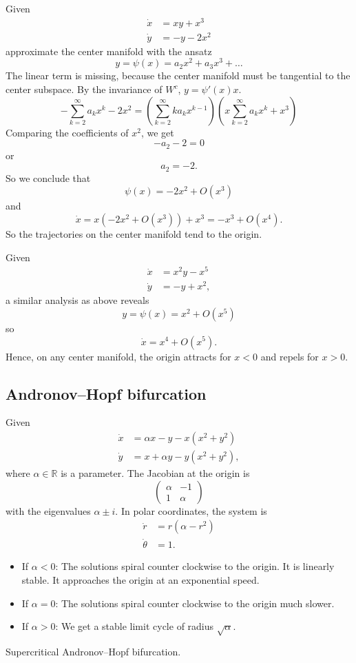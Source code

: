 \documentclass{article}
\newcommand*{\R}{\mathbb{R}}
\newcommand*{\mattwo}[4]{\begin{pmatrix}
    #1&#2\\#3&#4
\end{pmatrix}}
\begin{document}
\begin{exam}
    Given
    $$\begin{aligned}
        \dot x &= xy+x^3\\
        \dot y &= -y-2x^2
    \end{aligned}$$
    approximate the center manifold with the ansatz
    $$y=\psi(x)=a_2x^2+a_3x^3+\dots$$
    The linear term is missing, because the center manifold must be tangential to the center subspace. By the invariance of $W^c$, $y=\psi'(x)x$.
    $$-\sum_{k=2}^\infty a_kx^k-2x^2=\left(\sum_{k=2}^\infty ka_kx^{k-1}\right)\left(x\sum_{k=2}^\infty a_kx^k+x^3\right)$$
    Comparing the coefficients of $x^2$, we get $$-a_2-2=0$$
    or
    $$a_2=-2.$$
    So we conclude that
    $$\psi(x)=-2x^2+O(x^3)$$
    and
    $$\dot x = x(-2x^2+O(x^3))+x^3=-x^3+O(x^4).$$
    So the trajectories on the center manifold tend to the origin.
\end{exam}

\begin{exam}
    Given
    $$\begin{aligned}
        \dot x &= x^2y-x^5\\
        \dot y &= -y+x^2,
    \end{aligned}$$
    a similar analysis as above reveals
    $$y=\psi(x)=x^2+O(x^5)$$
    so
    $$\dot x = x^4+O(x^5).$$
    Hence, on any center manifold, the origin attracts for $x<0$ and repels for $x>0$.

\end{exam}

\subsection{Andronov--Hopf bifurcation}

\begin{exam}
    Given
    $$\begin{aligned}
        \dot x &= \alpha x-y-x(x^2+y^2)\\
        \dot y &= x+\alpha y - y(x^2+y^2),
    \end{aligned}$$
    where $\alpha \in \R$ is a parameter.
    The Jacobian at the origin is
    $$\mattwo\alpha{-1}1\alpha$$
    with the eigenvalues $\alpha \pm i$. In polar coordinates, the system is
    $$\begin{aligned}
        \dot r &= r(\alpha-r^2)\\
        \dot \theta &= 1.
    \end{aligned}$$
    \begin{itemize}
        \item If $\alpha < 0$: The solutions spiral counter clockwise to the origin. It is linearly stable. It approaches the origin at an exponential speed.

        \item If $\alpha = 0$: The solutions spiral counter clockwise to the origin much slower.

        \item If $\alpha > 0$: We get a stable limit cycle of radius $\sqrt{\alpha}$.
    \end{itemize}
    Supercritical Andronov--Hopf bifurcation.
\end{exam}
\end{document}
